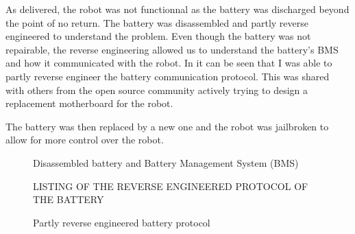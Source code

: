 \documentclass[11pt]{article}
\begin{document}
        As delivered, the robot was not functionnal as the battery was discharged beyond the point of no return. The battery was disassembled and partly reverse engineered to understand the problem. Even though the battery was not repairable, the reverse engineering allowed us to understand the battery's BMS and how it communicated with the robot. In \cite{battery_reverse_engineering}
        it can be seen that I was able to partly reverse engineer the battery communication protocol. This was shared with others from the open source community actively trying to design a replacement motherboard for the robot. 
        
        The battery was then replaced by a new one and the robot was jailbroken to allow for more control over the robot.
        

        \begin{figure}[H]
            \centering
            \caption{Disassembled battery and Battery Management System (BMS)}
        \end{figure}


        \begin{figure}[H]
            \centering
            \color{red}LISTING OF THE REVERSE ENGINEERED PROTOCOL OF THE BATTERY
            \caption{Partly reverse engineered battery protocol}
            \label{fig:battery_protocol}
        \end{figure}
\end{document}
